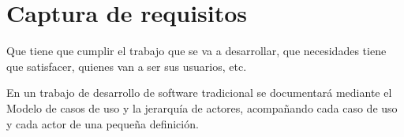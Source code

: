 \chapter{Captura de requisitos}
Que tiene que cumplir el trabajo que se va a desarrollar, 
que necesidades tiene que satisfacer, quienes van a ser sus usuarios, etc.

En un trabajo de desarrollo de software tradicional se 
documentará mediante el Modelo de casos de uso y la jerarquía 
de actores, acompañando cada caso de uso y cada actor de una pequeña definición.